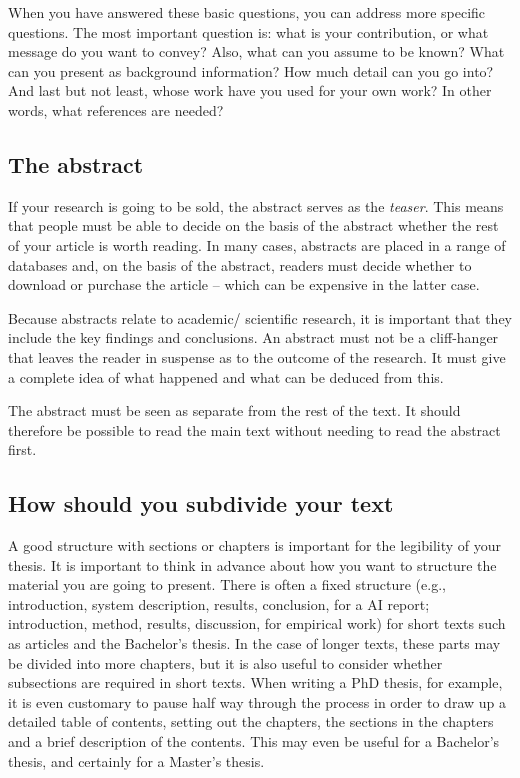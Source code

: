 When you have answered these basic questions, you can address more specific questions. The most important question is: what is your contribution, or what message do you want to convey? Also, what can you assume to be known? What can you present as background information? How much detail can you go into? And last but not least, whose work have you used for your own work? In other words, what references are needed?

\subsection{The abstract}\label{sec:_the_abstract}
If your research is going to be sold, the abstract serves as the \textit{teaser}. This means that people must be able to decide on the basis of the abstract whether the rest of your article is worth reading. In many cases, abstracts are placed in a range of databases and, on the basis of the abstract, readers must decide whether to download or purchase the article – which can be expensive in the latter case.

Because abstracts relate to academic/ scientific research, it is important that they include the key findings and conclusions.  An abstract must not be a cliff-hanger that leaves the reader in suspense as to the outcome of the research. It must give a complete idea of what happened and what can be deduced from this.

The abstract must be seen as separate from the rest of the text. It should therefore be possible to read the main text without needing to read the abstract first.

\subsection{How should you subdivide your text}\label{sec:_subdivide_text}
A good structure with sections or chapters is important for the legibility of your thesis. It is important to think in advance about how you want to structure the material you are going to present. There is often a fixed structure (e.g., introduction, system description, results, conclusion, for a AI report; introduction, method, results, discussion, for empirical work) for short texts such as articles and the Bachelor's thesis. In the case of longer texts, these parts may be divided into more chapters, but it is also useful to consider whether subsections are required in short texts. When writing a PhD thesis, for example, it is even customary to pause half way through the process in order to draw up a detailed table of contents, setting out the chapters, the sections in the chapters and a brief description of the contents. This may even be useful for a Bachelor's thesis, and certainly for a Master's thesis.

